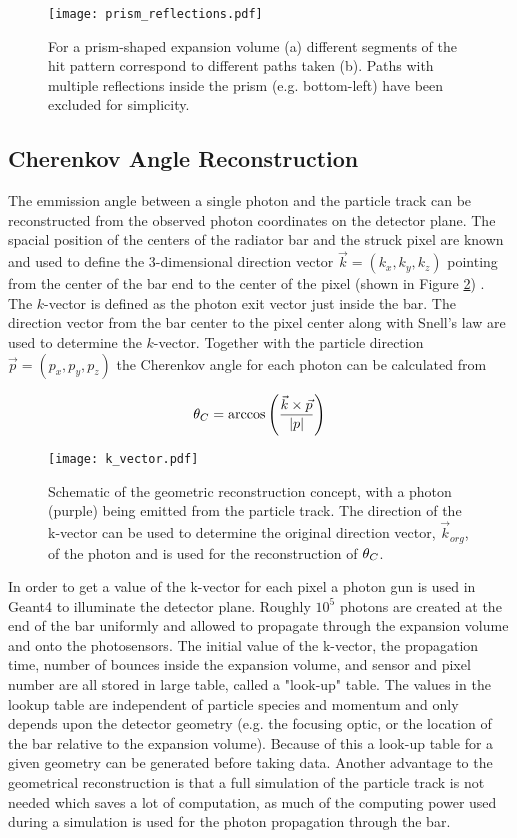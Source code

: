 \begin{figure}[H]
	\centering
	\texttt{[image: prism\_reflections.pdf]}
	\caption{For a prism-shaped expansion volume (a) different segments of the hit pattern correspond to different paths taken (b). Paths with multiple reflections inside the prism (e.g. bottom-left) have been excluded for simplicity.}
	\label{fig:prism_reflections}
\end{figure}

\subsection{Cherenkov Angle Reconstruction}
The emmission angle between a single photon and the particle track can be reconstructed from the observed photon coordinates on the detector plane. The spacial position of the centers of the radiator bar and the struck pixel are known and used to define the 3-dimensional direction vector $\vec{k} = (k_x, k_y, k_z)$ pointing from the center of the bar end to the center of the pixel (shown in Figure \ref{fig:k_vector}) . The $k$-vector is defined as the photon exit vector just inside the bar. The direction vector from the bar center to the pixel center along with Snell's law are used to determine the $k$-vector. Together with the particle direction $\vec{p} = (p_x, p_y, p_z)$ the Cherenkov angle for each photon can be calculated from

\begin{equation}
	\theta_{C} = \arccos\left(\frac{\vec{k}\times\vec{p}}{|p|}\right)
\end{equation}

\begin{figure}[ht]
	\centering
	\texttt{[image: k\_vector.pdf]}
	\caption{Schematic of the geometric reconstruction concept, with a photon (purple) being emitted from the particle track. The direction of the k-vector can be used to determine the original direction vector, $\vec{k}_{org}$, of the photon and is used for the reconstruction of $\theta_{C}$.}
	\label{fig:k_vector}
\end{figure}

In order to get a value of the k-vector for each pixel a photon gun is used in Geant4 to illuminate the detector plane. Roughly $10^5$ photons are created at the end of the bar uniformly and allowed to propagate through the expansion volume and onto the photosensors. The initial value of the k-vector, the propagation time,  number of bounces inside the expansion volume, and sensor and pixel number are all stored in large table, called a "look-up" table. The values in the lookup table are independent of particle species and momentum and only depends upon the detector geometry (e.g. the focusing optic, or the location of the bar relative to the expansion volume). Because of this a look-up table for a given geometry can be generated before taking data. Another advantage to the geometrical reconstruction is that a full simulation of the particle track is not needed which saves a lot of computation, as much of the computing power used during a simulation is used for the photon propagation through the bar.

